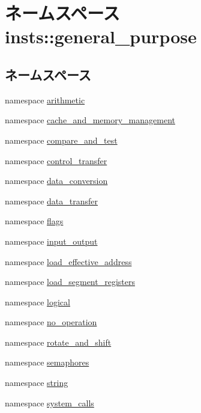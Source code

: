 \hypertarget{namespaceinsts_1_1general__purpose}{
\section{ネームスペース insts::general\_\-purpose}
\label{namespaceinsts_1_1general__purpose}
}
\subsection*{ネームスペース}
\begin{DoxyCompactItemize}
\item 
namespace \hyperlink{namespaceinsts_1_1general__purpose_1_1arithmetic}{arithmetic}
\item 
namespace \hyperlink{namespaceinsts_1_1general__purpose_1_1cache__and__memory__management}{cache\_\-and\_\-memory\_\-management}
\item 
namespace \hyperlink{namespaceinsts_1_1general__purpose_1_1compare__and__test}{compare\_\-and\_\-test}
\item 
namespace \hyperlink{namespaceinsts_1_1general__purpose_1_1control__transfer}{control\_\-transfer}
\item 
namespace \hyperlink{namespaceinsts_1_1general__purpose_1_1data__conversion}{data\_\-conversion}
\item 
namespace \hyperlink{namespaceinsts_1_1general__purpose_1_1data__transfer}{data\_\-transfer}
\item 
namespace \hyperlink{namespaceinsts_1_1general__purpose_1_1flags}{flags}
\item 
namespace \hyperlink{namespaceinsts_1_1general__purpose_1_1input__output}{input\_\-output}
\item 
namespace \hyperlink{namespaceinsts_1_1general__purpose_1_1load__effective__address}{load\_\-effective\_\-address}
\item 
namespace \hyperlink{namespaceinsts_1_1general__purpose_1_1load__segment__registers}{load\_\-segment\_\-registers}
\item 
namespace \hyperlink{namespaceinsts_1_1general__purpose_1_1logical}{logical}
\item 
namespace \hyperlink{namespaceinsts_1_1general__purpose_1_1no__operation}{no\_\-operation}
\item 
namespace \hyperlink{namespaceinsts_1_1general__purpose_1_1rotate__and__shift}{rotate\_\-and\_\-shift}
\item 
namespace \hyperlink{namespaceinsts_1_1general__purpose_1_1semaphores}{semaphores}
\item 
namespace \hyperlink{namespaceinsts_1_1general__purpose_1_1string}{string}
\item 
namespace \hyperlink{namespaceinsts_1_1general__purpose_1_1system__calls}{system\_\-calls}
\end{DoxyCompactItemize}
